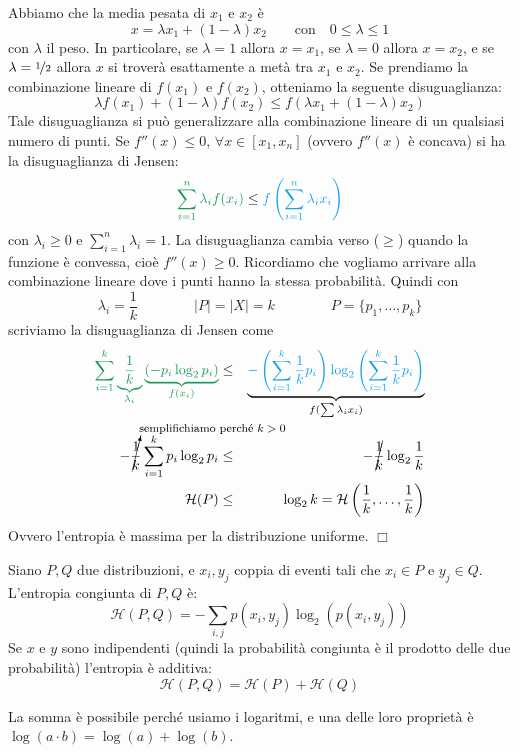 Abbiamo che la media pesata di $x_1$ e $x_2$ è
$$
    x = \lambda x_1 + (1-\lambda)x_2 \qquad \text{con} \quad 0\leq\lambda\leq 1
$$
con $\lambda$ il peso. In particolare, se $\lambda=1$ allora $x=x_1$, se $\lambda=0$ allora $x=x_2$, e se $\lambda=\nicefrac{1}{2}$ allora $x$ si troverà esattamente a metà tra $x_1$ e $x_2$. Se prendiamo la combinazione lineare di $f(x_1)$ e $f(x_2)$, otteniamo la seguente di\-su\-gua\-glian\-za:
$$
    \lambda f(x_1) + (1-\lambda)f(x_2) \leq f(\lambda x_1 + (1-\lambda)x_2)
$$
Tale disuguaglianza si può generalizzare alla combinazione lineare di un qualsiasi numero di punti. Se $f''(x)\leq 0$, $\forall x\in[x_1,x_n]$ (ovvero $f''(x)$ è concava) si ha la disuguaglianza di Jensen: 
$$
\textcolor{ForestGreen}{\sum_{i=1}^n\lambda_if(x_i)} \leq \textcolor{Cerulean}{f\left(\sum_{i=1}^n\lambda_ix_i\right)}
$$
con $\lambda_i\geq0$ e $\sum_{i=1}^n\lambda_i=1$. La disuguaglianza cambia verso ($\geq$) quando la funzione è convessa, cioè $f''(x)\geq 0$. Ricordiamo che vogliamo arrivare alla combinazione lineare dove i punti hanno la stessa probabilità. Quindi con
$$
    \lambda_i=\frac{1}{k} \qquad\qquad |P|=|X|=k \qquad\qquad P=\{p_1,\dots,p_k\}
$$
scriviamo la disuguaglianza di Jensen come
\begin{eqnarray*}
    \textcolor{ForestGreen}{\sum_{i=1}^k\underbrace{\frac{1}{k}}_{\lambda_i}\underbrace{(-p_i\log_2p_i)}_{f(x_i)}} & \leq & \underbrace{\textcolor{Cerulean}{-\left(\sum_{i=1}^k\frac{1}{k}p_i\right)\log_2\left(\sum_{i=1}^k\frac{1}{k}p_i\right)}}_{f(\sum\lambda_ix_i)}\\
    -\cancelto{\text{\footnotesize semplifichiamo perché $k>0$}}{\frac{1}{k}}\sum_{i=1}^kp_i\log_2p_i & \leq & -\cancel{\frac{1}{k}}\log_2\frac{1}{k}\\
    \mathcal{H}(P) & \leq & \log_2k=\mathcal{H}\left(\frac{1}{k},\dots,\frac{1}{k}\right)
\end{eqnarray*}
Ovvero l'entropia è massima per la distribuzione uniforme. \hfill$\Box$\bigskip 

\begin{property}
    Siano $P,Q$ due distribuzioni, e $x_i,y_j$ coppia di eventi tali che $x_i\in P$ e $y_j\in Q$. L'entropia congiunta di $P,Q$ è:
    $$
        \mathcal{H}(P,Q) = -\sum_{i,j}p(x_i,y_j)\log_2(p(x_i,y_j))
    $$
    Se $x$ e $y$ sono indipendenti (quindi la probabilità congiunta è il prodotto delle due probabilità) l'entropia è additiva:
    $$
        \mathcal{H}(P,Q) = \mathcal{H}(P) + \mathcal{H}(Q)
    $$
\end{property}
La somma è possibile perché usiamo i logaritmi, e una delle loro proprietà è $\log(a\cdot b)=\log(a)+\log(b)$.


